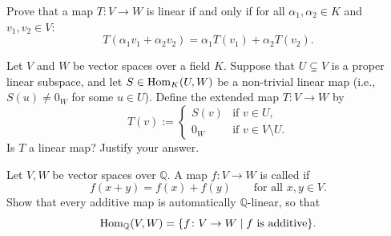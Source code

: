 \begin{exercise}
\label{exer:linearity_criterion}
Prove that a map $T: V \to W$ is linear if and only if for all $\alpha_1, \alpha_2 \in K$ and $v_1, v_2 \in V$:
\[
T(\alpha_1 v_1 + \alpha_2 v_2) = \alpha_1 T(v_1) + \alpha_2 T(v_2).
\]
\end{exercise}

\begin{exercise}
\label{exc:extending_linear_map_by_zero}
Let $V$ and $W$ be vector spaces over a field $K$. Suppose that $U \subsetneq V$ is a proper linear subspace, and let $S \in \operatorname{Hom}_K(U, W)$ be a non-trivial linear map (i.e., $S(u) \ne 0_W$ for some $u \in U$). Define the extended map $T \colon V \to W$ by
\[
T(v) :=
\begin{cases}
S(v) & \text{if } v \in U, \\
0_W & \text{if } v \in V \setminus U.
\end{cases}
\]
Is $T$ a linear map? Justify your answer.
\end{exercise}

\begin{exercise}
\label{exc:additive_maps_over_rationals}
Let $V, W$ be vector spaces over $\mathbb{Q}$. A map $f \colon V \to W$ is called  if
\[
f(x + y) = f(x) + f(y) \qquad \text{for all } x, y \in V.
\]
Show that every additive map is automatically $\mathbb{Q}$-linear, so that
\[
\operatorname{Hom}_{\mathbb{Q}}(V, W) = \{f \colon V \to W \mid f \text{ is additive}\}.
\]
\end{exercise}

